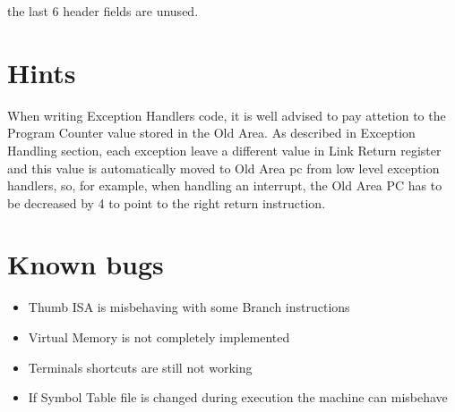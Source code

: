 the last 6 header fields are unused.

\section{Hints}

When writing Exception Handlers code, it is well advised to pay attetion to the Program Counter value stored in the Old Area. As described in Exception Handling section, each exception leave a different value in Link Return register and this value is automatically moved to Old Area pc from low level exception handlers, so, for example, when handling an interrupt, the Old Area PC has to be decreased by 4 to point to the right return instruction.

\section{Known bugs}

\begin{itemize}
\item Thumb ISA is misbehaving with some Branch instructions
\item Virtual Memory is not completely implemented
\item Terminals shortcuts are still not working
\item If Symbol Table file is changed during execution the machine can misbehave

\end{itemize}

